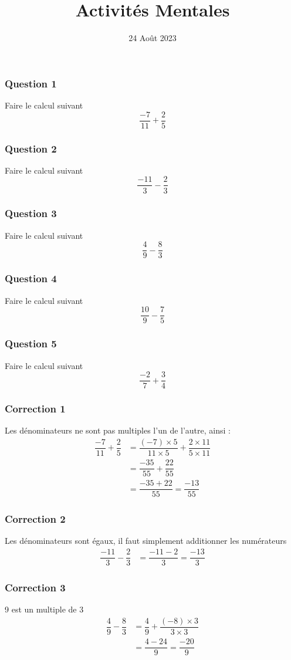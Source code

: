 \documentclass[15pt, mathserif]{beamer}
\title{Activités Mentales}
\date{24 Août 2023}
\begin{document}
\begin{frame}
    \titlepage
\end{frame}

\begin{frame} 
	\frametitle{Question 1}
	Faire le calcul suivant \[\dfrac{-7}{11}+\dfrac{2}{5}\]
\end{frame}


\begin{frame} 
	\frametitle{Question 2}
	Faire le calcul suivant \[\dfrac{-11}{3}-\dfrac{2}{3}\]
\end{frame}


\begin{frame} 
	\frametitle{Question 3}
	Faire le calcul suivant \[\dfrac{4}{9}-\dfrac{8}{3}\]
\end{frame}


\begin{frame} 
	\frametitle{Question 4}
	Faire le calcul suivant \[\dfrac{10}{9}-\dfrac{7}{5}\]
\end{frame}


\begin{frame} 
	\frametitle{Question 5}
	Faire le calcul suivant \[\dfrac{-2}{7}+\dfrac{3}{4}\]
\end{frame}


\begin{frame}
\vspace{-10mm}
	\frametitle{Correction 1}
Les dénominateurs ne sont pas multiples l'un de l'autre, ainsi : 	\begin{align*}
		\dfrac{-7}{11}+\dfrac{2}{5}&=\dfrac{\left(-7\right)\times5}{11\times5} + \dfrac{2\times11}{5\times11}\\[1ex]
		&=\dfrac{-35}{55}+\dfrac{22}{55}\\[1ex]
		&=\dfrac{-35+22}{55}=\dfrac{-13}{55}
	\end{align*}
\end{frame}


\begin{frame}
\vspace{-10mm}
	\frametitle{Correction 2}
Les dénominateurs sont égaux, il faut simplement additionner les numérateurs	\begin{align*}
		\dfrac{-11}{3}-\dfrac{2}{3}&=\dfrac{-11-2}{3}=\dfrac{-13}{3}
	\end{align*}
\end{frame}


\begin{frame}
\vspace{-10mm}
	\frametitle{Correction 3}
9 est un multiple de 3	\begin{align*}
		\dfrac{4}{9}-\dfrac{8}{3}&=\dfrac{4}{9}+ \dfrac{\left(-8\right)\times3}{3\times3}\\[1ex]
		&=\dfrac{4-24}{9}=\dfrac{-20}{9}
	\end{align*}
\end{frame}
\end{document}
